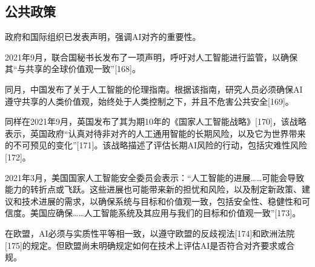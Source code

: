 \subsection{公共政策}   
政府和国际组织已发表声明，强调AI对齐的重要性。

2021年9月，联合国秘书长发布了一项声明，呼吁对人工智能进行监管，以确保其“与共享的全球价值观一致”[168]。

同月，中国发布了关于人工智能的伦理指南。根据该指南，研究人员必须确保AI遵守共享的人类价值观，始终处于人类控制之下，并且不危害公共安全[169]。

同样在2021年9月，英国发布了其为期10年的《国家人工智能战略》[170]，该战略表示，英国政府“认真对待非对齐的人工通用智能的长期风险，以及它为世界带来的不可预见的变化”[171]。该战略描述了评估长期AI风险的行动，包括灾难性风险[172]。

2021年3月，美国国家人工智能安全委员会表示：“人工智能的进展……可能会导致能力的转折点或飞跃。这些进展也可能带来新的担忧和风险，以及制定新政策、建议和技术进展的需求，以确保系统与目标和价值观一致，包括安全性、稳健性和可信度。美国应确保……人工智能系统及其应用与我们的目标和价值观一致”[173]。

在欧盟，AI必须与实质性平等相一致，以遵守欧盟的反歧视法[174]和欧洲法院[175]的规定。但欧盟尚未明确规定如何在技术上评估AI是否符合对齐要求或合规。